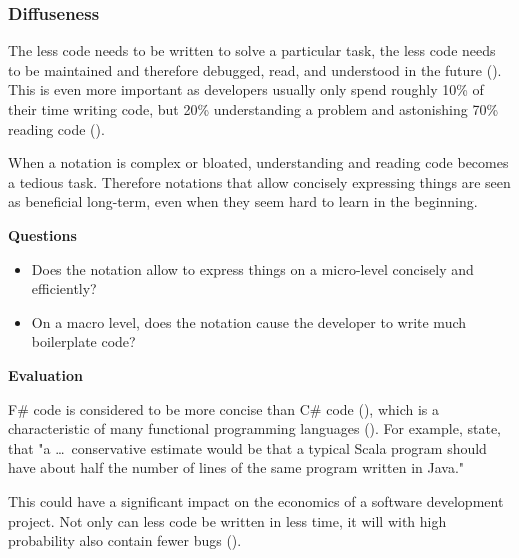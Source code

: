 \subsubsection{Diffuseness}

The less code needs to be written to solve a particular task, the less code needs to be maintained and therefore debugged, read, and understood in the future (\cite{atwood_best_2007}). This is even more important as developers usually only spend roughly 10\% of their time writing code, but 20\% understanding a problem and astonishing 70\% reading code (\cite[69]{lilienthal_langlebige_2017}). 

When a notation is complex or bloated, understanding and reading code becomes a tedious task. Therefore notations that allow concisely expressing things are seen as beneficial long-term, even when they seem hard to learn in the beginning.

\textbf{Questions}

\begin{itemize}
\item Does the notation allow to express things on a micro-level concisely and efficiently?
\item On a macro level, does the notation cause the developer to write much boilerplate code? 
\end{itemize}

\textbf{Evaluation}

F\# code is considered to be more concise than C\# code (\cite[xiii]{liu_f_2013}), which is a characteristic of many functional programming languages (\cite{nanz_comparative_2015}). For example, \cite[49]{odersky_programming_2008} state, that "a \dots\ conservative estimate would be that a typical Scala program should have about half the number of lines of the same program written in Java."
    
This could have a significant impact on the economics of a software development project. Not only can less code be written in less time, it will with high probability also contain fewer bugs (\cite{ray_large_2014}).

